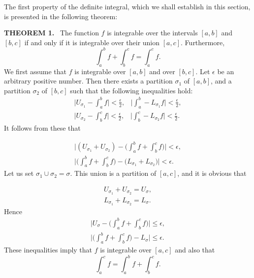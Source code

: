 The first property of the definite integral, which we shall establish in this section, is presented in the following theorem:
\medskip

\noindent \textbf{THEOREM 1.}~
The function $f$ is integrable over the intervals $[a, b]$ and $[b, c]$ if and only if it is integrable over their union $[a, c]$. Furthermore,
$$
\int_a^b f + \int_b^c f  = \int_a^c f.
$$
\proof We first assume that $f$ is integrable over $[a, b]$ and over $[b, c]$. Let $\epsilon$ be an arbitrary positive number. Then there exists a partition $\sigma_1$ of $[a, b]$, and a partition $\sigma_2$ of $[b, c]$ such that the following inequalities hold: 
\begin{eqnarray*}
\Big| U_{\sigma_1} - \int_a^b f \Big| < \frac{\epsilon}{2} , \;\;\;
\Big| \int_a^b - L_{\sigma_1} f \Big| < \frac{\epsilon}{2}  , \\
\Big| U_{\sigma_2} - \int_b^c f \Big| < \frac{\epsilon}{2} , \;\;\;  
\Big| \int_b^c - L_{\sigma_2} f \Big| < \frac{\epsilon}{2} .
\end{eqnarray*}
It follows from these that

\begin{eqnarray*}
\Big| (U_{\sigma_1} + U_{\sigma_2}) - \Big( \int_a^b f + \int_b^c f \Big) \Big| < \epsilon ,\\
\Big| \Big(\int_a^b f + \int_b^c f \Big) - \Big(L_{\sigma_1} + L_{\sigma_2} \Big) \Big| < \epsilon .
\end{eqnarray*}
Let us set ${\sigma_1} \cup {\sigma_2} = \sigma$. This union is a partition of $[a, c]$, and it is obvious that

\begin{eqnarray*}
U_{\sigma_1} + U_{\sigma_2} = U_\sigma, \\
L_{\sigma_1} + L_{\sigma_2} = L_\sigma . 
\end{eqnarray*}
Hence 
\begin{eqnarray*}
\Big| U_\sigma  -  \Big(\int_a^b f + \int_b^c f \Big) \Big| \leq \epsilon, \\
\Big| \Big(\int_a^b f + \int_b^c f \Big) - L_\sigma \Big| \leq \epsilon .
\end{eqnarray*}
These inequalities imply that $f$ is integrable over $[a, c]$ and also that
$$
\int_a^c f = \int_a^b f + \int_b^c f .
$$

